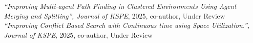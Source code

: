\noindent
\small\textit{“Improving Multi-agent Path Finding in Clustered Environments Using Agent Merging and Splitting”, Journal of KSPE}, 2025, co-author, Under Review \\[0.3em]
\small\textit{“Improving Conflict Based Search with Continuous time using Space Utilization.”, Journal of KSPE}, 2025, co-author, Under Review